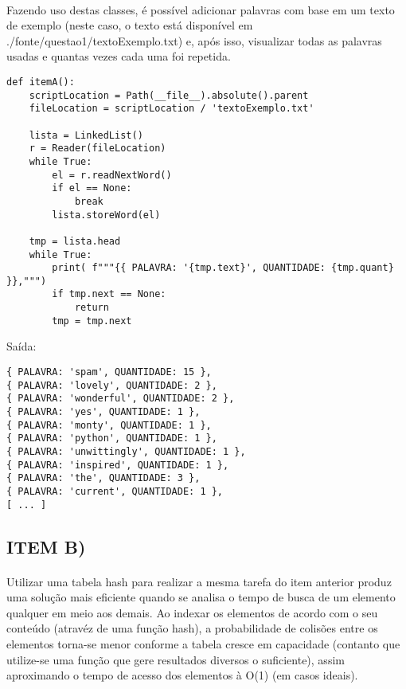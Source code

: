 \documentclass[12pt, letterpaper]{article}
\begin{document}
\paragraph{}
Fazendo uso destas classes, é possível adicionar palavras com base em um texto de exemplo
(neste caso, o texto está disponível em ./fonte/questao1/textoExemplo.txt) e, após isso,
visualizar todas as palavras usadas e quantas vezes cada uma foi repetida.

\begin{lstlisting}
def itemA():
    scriptLocation = Path(__file__).absolute().parent
    fileLocation = scriptLocation / 'textoExemplo.txt'

    lista = LinkedList()
    r = Reader(fileLocation)
    while True:
        el = r.readNextWord()
        if el == None:
            break
        lista.storeWord(el)

    tmp = lista.head
    while True:
        print( f"""{{ PALAVRA: '{tmp.text}', QUANTIDADE: {tmp.quant} }},""")
        if tmp.next == None:
            return
        tmp = tmp.next
\end{lstlisting}

Saída:

\begin{lstlisting}
{ PALAVRA: 'spam', QUANTIDADE: 15 },
{ PALAVRA: 'lovely', QUANTIDADE: 2 },
{ PALAVRA: 'wonderful', QUANTIDADE: 2 },
{ PALAVRA: 'yes', QUANTIDADE: 1 },
{ PALAVRA: 'monty', QUANTIDADE: 1 },
{ PALAVRA: 'python', QUANTIDADE: 1 },
{ PALAVRA: 'unwittingly', QUANTIDADE: 1 },
{ PALAVRA: 'inspired', QUANTIDADE: 1 },
{ PALAVRA: 'the', QUANTIDADE: 3 },
{ PALAVRA: 'current', QUANTIDADE: 1 },
[ ... ]
\end{lstlisting}

\subsection{ITEM B)}
\paragraph{}
Utilizar uma tabela hash para realizar a mesma tarefa do item anterior produz uma solução
mais eficiente quando se analisa o tempo de busca de um elemento qualquer em meio aos
demais. Ao indexar os elementos de acordo com o seu conteúdo (atravéz de uma função hash),
a probabilidade de colisões entre os elementos torna-se menor conforme a tabela cresce
em capacidade (contanto que utilize-se uma função que gere resultados diversos o
suficiente), assim aproximando o tempo de acesso dos elementos à O(1) (em casos ideais).
\end{document}
